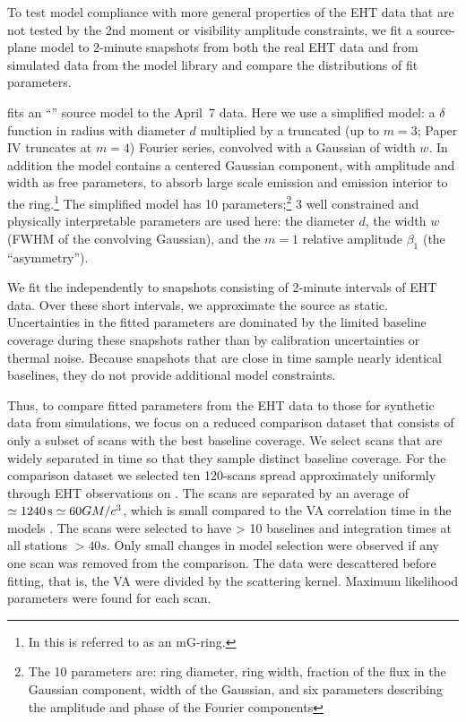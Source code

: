 To test model compliance with more general properties of the EHT data that are not tested by the 2nd moment or visibility amplitude constraints, we fit a source-plane model to 2-minute snapshots from both the real EHT data and from simulated data from the model library and compare the distributions of fit parameters.

 fits an ``\mring'' source model to the April~7 data.  Here we use a simplified \mring model: a $\delta$ function in radius with diameter $d$ multiplied by a truncated (up to $m = 3$; Paper IV truncates at $m = 4$) Fourier series, convolved with a Gaussian of width $w$.  In addition the model contains a centered Gaussian component, with amplitude and width as free parameters, to absorb large scale emission and emission interior to the ring.\footnote{In \cite{PaperIV} this is referred to as an mG-ring.}  The simplified \mring model has 10 parameters;\footnote{The 10 parameters are: ring diameter, ring width, fraction of the flux in the Gaussian component, width of the Gaussian, and six parameters describing the amplitude and phase of the Fourier components} 3 well constrained and physically interpretable parameters are used here: the \mring diameter $d$, the \mring width $w$ (FWHM of the convolving  Gaussian), and the $m=1$ relative amplitude $\beta_1$ (the ``asymmetry'').

We fit the \mring independently to snapshots consisting of 2-minute intervals of EHT data. Over these short intervals, we approximate the source as static.  Uncertainties in the fitted \mring parameters are dominated by the limited baseline coverage during these snapshots rather than by calibration uncertainties or thermal noise. Because snapshots that are close in time sample nearly identical baselines, they do not provide additional model constraints.

Thus, to compare fitted \mring parameters from the EHT data to those for synthetic data from simulations, we focus on a reduced comparison dataset that consists of only a subset of scans with the best baseline coverage. We select scans that are widely separated in time so that they sample distinct baseline coverage. For the comparison dataset we selected ten 120-\sec scans spread approximately uniformly through EHT observations on \aprilvii.  The scans are separated by an average of $\simeq 1240\,\mathrm{s} \simeq 60 GM/c^3$, which is small compared to the VA correlation time in the models \citep{Georgiev_2022}. The scans were selected to have > 10 baselines and integration times at all stations $> 40s$.  Only small changes in model selection were observed if any one scan was removed from the comparison.  The data were descattered before fitting, that is, the VA were divided by the scattering kernel.  Maximum likelihood \mring parameters were found for each scan.

